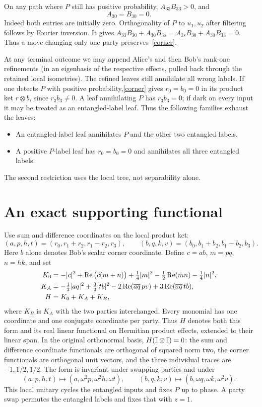 \documentclass[11pt]{article}
\begin{document}
On any path where $P$ still has positive probability, $A_{33}B_{33}>0$, and
\begin{equation} A_{30}=B_{30}=0.\label{corner}\end{equation}
Indeed both entries are initially zero. Orthogonality of $P$ to $u_1,u_2$ after filtering follows by Fourier inversion. It gives
$A_{33}B_{30}+A_{30}B_{3s}=A_{3s}B_{30}+A_{30}B_{33}=0$.
Thus a move changing only one party preserves~\eqref{corner}.

At any terminal outcome we may append Alice's and then Bob's rank-one refinements (in an eigenbasis of the respective effects, pulled back through the retained local isometries). The refined leaves still annihilate all wrong labels. If one detects $P$ with positive probability,\eqref{corner} gives $r_0=b_0=0$ in its product ket $r\otimes b$, since $r_3 b_3\ne 0$. A leaf annihilating $P$ has $r_3 b_3=0$; if dark on every input it may be treated as an entangled-label leaf. Thus the following families exhaust the leaves:
\begin{itemize}
\item An entangled-label leaf annihilates $P$ and the other two entangled labels.
\item A positive $P$-label leaf has $r_0=b_0=0$ and annihilates all three entangled labels.
\end{itemize}
The second restriction uses the local tree, not separability alone.

\section{An exact supporting functional}
Use sum and difference coordinates on the local product ket:
\[
 (a,p,h,t)=(r_0,r_1+r_2,r_1-r_2,r_3),\qquad
 (b,q,k,v)=(b_0,b_1+b_2,b_1-b_2,b_3).
\]
Here $b$ alone denotes Bob's scalar corner coordinate. Define $c=ab$, $m=pq$, $n=hk$, and set
\begin{align*}
 K_0&=-|c|^2+\operatorname{Re}\big(\bar c(m+n)\big)+\tfrac14|m|^2-\tfrac12\operatorname{Re}(\bar m n)-\tfrac14|n|^2,\\
 K_A&=-\tfrac12|a q|^2+\tfrac32|t b|^2-2\operatorname{Re}(\overline{a q}\,p v)+3\operatorname{Re}(\overline{a q}\,t b),\\
 H&=K_0+K_A+K_B ,
\end{align*}
where $K_B$ is $K_A$ with the two parties interchanged. Every monomial has one coordinate and one conjugate coordinate per party. Thus $H$ denotes both this form and its real linear functional on Hermitian product effects, extended to their linear span. In the original orthonormal basis, $H(\mathbb I\otimes\mathbb I)=0$: the sum and difference coordinate functionals are orthogonal of squared norm two, the corner functionals are orthogonal unit vectors, and the three individual traces are $-1,1/2,1/2$.
The form is invariant under swapping parties and under
\begin{equation}
  (a,p,h,t)\longmapsto (a,\omega^2p,\omega^2h,\omega t),\qquad
  (b,q,k,v)\longmapsto (b,\omega q,\omega k,\omega^2 v).
  \label{rotation}
\end{equation}
This local unitary cycles the entangled inputs and fixes $P$ up to phase. A party swap permutes the entangled labels and fixes that with $z=1$.
\end{document}
